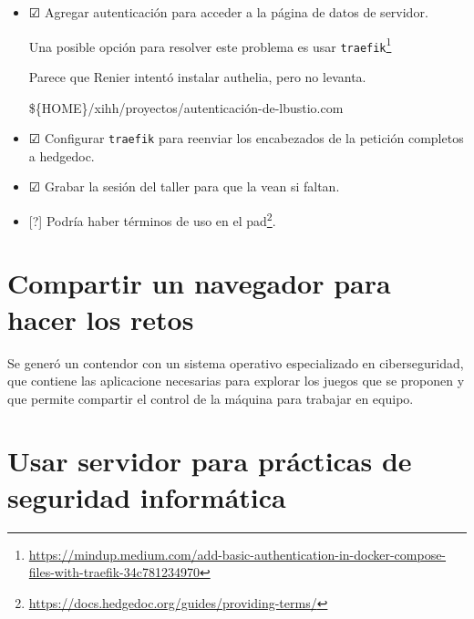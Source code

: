 \documentclass[
  12,
]{scrartcl}
\DeclareRobustCommand{\href}[2]{#2\footnote{\url{#1}}}
\begin{document}
\begin{itemize}
\begin{itemize}
\begin{verbatim}
ssh lb
USER=
docker exec -ti escritura-colaborativa-app-1 bash
/hedgedoc/bin/manage_users --add ${USER}
\end{verbatim}
  \item
    Podría agregarse un proxy de identidad como
    \href{https://github.com/authelia/authelia/}{authelia}.
  \item
    Podría solicitar que usen una cuenta de GitLab y utilizar el
    servidor de autenticación de GitLab.
  \end{itemize}
\item
  ☑ Agregar autenticación para acceder a la página de datos de servidor.

  \href{https://mindup.medium.com/add-basic-authentication-in-docker-compose-files-with-traefik-34c781234970}{Una
  posible opción para resolver este problema es usar \texttt{traefik}}

  Parece que Renier intentó instalar authelia, pero no levanta.

  \$\{HOME\}/xihh/proyectos/autenticación-de-lbustio.com
\item
  ☑ Configurar \texttt{traefik} para reenviar los encabezados de la
  petición completos a hedgedoc.
\item
  ☑ Grabar la sesión del taller para que la vean si faltan.
\item
  {[}?{]}
  \href{https://docs.hedgedoc.org/guides/providing-terms/}{Podría haber
  términos de uso en el pad}.
\end{itemize}

\hypertarget{compartir-un-navegador-para-hacer-los-retos}{%
\section{Compartir un navegador para hacer los
retos}\label{compartir-un-navegador-para-hacer-los-retos}}

Se generó un contendor con un sistema operativo especializado en
ciberseguridad, que contiene las aplicacione necesarias para explorar
los juegos que se proponen y que permite compartir el control de la
máquina para trabajar en equipo.

\hypertarget{usar-servidor-para-pruxe1cticas-de-seguridad-informuxe1tica}{%
\section{Usar servidor para prácticas de seguridad
informática}\label{usar-servidor-para-pruxe1cticas-de-seguridad-informuxe1tica}}
\end{document}
